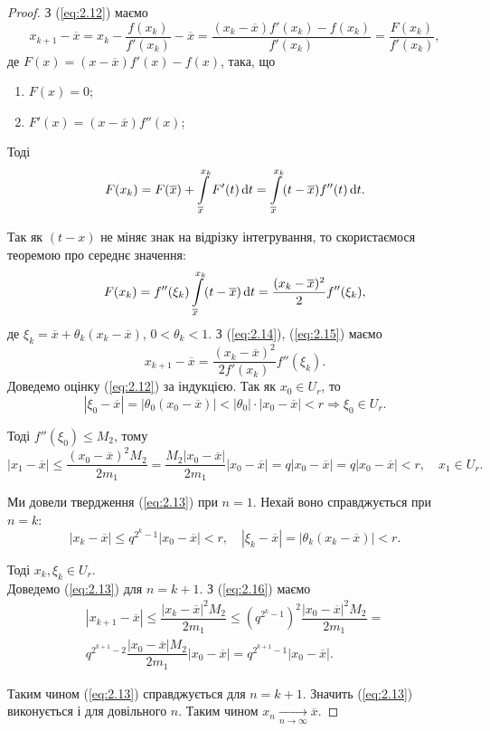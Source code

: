\begin{proof}
	З (\ref{eq:2.12}) маємо 
	\begin{equation}
		\label{eq:2.14}
		x_{k+1} - \overline{x} = x_k - \dfrac{f(x_k)}{f'(x_k)} - \overline{x} = \dfrac{(x_k-\overline{x})f'(x_k)-f(x_k)}{f'(x_k)} = \dfrac{F(x_k)}{f'(x_k)},
	\end{equation}
	де $F(x) = (x - \overline{x}) f'(x) - f (x)$, така, що
	\begin{enumerate}
		\item $F(x) = 0$;
		\item $F'(x) = (x - \overline{x}) f''(x)$;
	\end{enumerate}
	Тоді \[ F(x_k) = F(\overline{x}) + \displaystyle\int\limits_{\overline{x}}^{x_k}  F'(t) \mathop{}\!\mathrm{d} t = \displaystyle\int\limits_{\overline{x}}^{x_k}  (t - \overline{x}) f''(t) \mathop{}\!\mathrm{d} t . \]

	Так як $(t - x)$ не міняє знак на відрізку інтегрування, то скористаємося теоремою про середнє значення:
	\begin{equation}
		\label{eq:2.15}
		F(x_k) = f''(\xi_k) \displaystyle\int\limits_{\overline{x}}^{x_k}  (t - \overline{x}) \mathop{}\!\mathrm{d} t = \dfrac{(x_k-\overline{x})^2}{2} f''(\xi_k),
	\end{equation}
	де $\xi_k = \overline{x} + \theta_k (x_k - \overline{x})$, $0 <\theta_k < 1$. З (\ref{eq:2.14}), (\ref{eq:2.15}) маємо
	\begin{equation}
		\label{eq:2.16}
		x_{k+1} - \overline{x} = \dfrac{(x_k-\overline{x})^2}{2f'(x_k)} f''(\xi_k).
	\end{equation}
	Доведемо оцінку (\ref{eq:2.12}) за індукцією. Так як $x_0 \in U_r$, то \[|\xi_0 - \overline{x}| = |\theta_0 (x_0 - \overline{x})| < |\theta_0| \cdot |x_0 - \overline{x}| < r \Rightarrow \xi_0 \in U_r.\]

	Тоді $f''(\xi_0) \le M_2$, тому \[ |x_1 - \overline{x}| \le \dfrac{(x_0-\overline{x})^2 M_2}{2m_1} = \dfrac{M_2|x_0-\overline{x}|}{2m_1}|x_0-\overline{x}| = q|x_0-\overline{x}|=q|x_0-\overline{x}|<r, \quad x_1\in U_r. \]

	Ми довели твердження (\ref{eq:2.13}) при $n = 1$. Нехай воно справджується при $n = k$:
	\[ |x_k - \overline{x}| \le q^{2^k-1}|x_0 - \overline{x}| < r, \quad |\xi_k - \overline{x}| = |\theta_k (x_k - \overline{x})| < r. \]

	Тоді $x_k, \xi_k \in U_r$. \\

	Доведемо (\ref{eq:2.13}) для $n = k +1$. З (\ref{eq:2.16}) маємо 
	\begin{multline*}
		|x_{k+1}-\overline{x}| \le \dfrac{|x_k - \overline{x}|^2 M_2}{2m_1} \le (q^{2^k-1})^2 \dfrac{|x_0-\overline{x}|^2M_2}{2m_1} = \\
		q^{2^{k+1}-2} \dfrac{|x_0-\overline{x}|M_2}{2m_1}|x_0-\overline{x}| = q^{2^{k+1}-1} |x_0-\overline{x}|.
	\end{multline*}

	Таким чином (\ref{eq:2.13}) справджується для $n = k +1$. Значить (\ref{eq:2.13}) виконується і для довільного $n$. Таким чином $x_n \xrightarrow[n\to\infty]{} \overline{x}$.
\end{proof}

